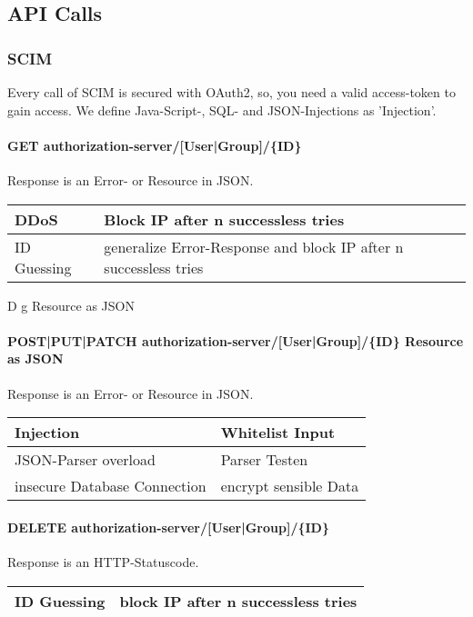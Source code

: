 \subsection{API Calls}
\subsubsection{SCIM}
Every call of SCIM is secured with OAuth2, so, you need a valid access-token to gain access. We define Java-Script-, SQL- and JSON-Injections as 'Injection'.

\paragraph{GET authorization-server/[User|Group]/\{ID\}}

Response is an Error- or Resource in JSON.

\begin{tabular}{|l|l|}
    \hline
    DDoS & Block IP after n successless tries\\
    \hline
    ID Guessing & generalize Error-Response and block IP after n successless tries\\

    \hline
 \end{tabular}

D
g
Resource as JSON\paragraph{POST|PUT|PATCH authorization-server/[User|Group]/\{ID\} Resource as JSON} 

Response is an Error- or Resource in JSON.

 
\begin{tabular}{|l|l|}
    \hline
    Injection & Whitelist Input\\
    \hline
    JSON-Parser overload & Parser Testen \\
    \hline
    insecure Database Connection & encrypt sensible Data \\
    \hline
 \end{tabular}

\paragraph{DELETE authorization-server/[User|Group]/\{ID\}}

Response is an HTTP-Statuscode.

\begin{tabular}{|l|l|}
   \hline
    ID Guessing & block IP after n successless tries\\
    \hline
 \end{tabular}

